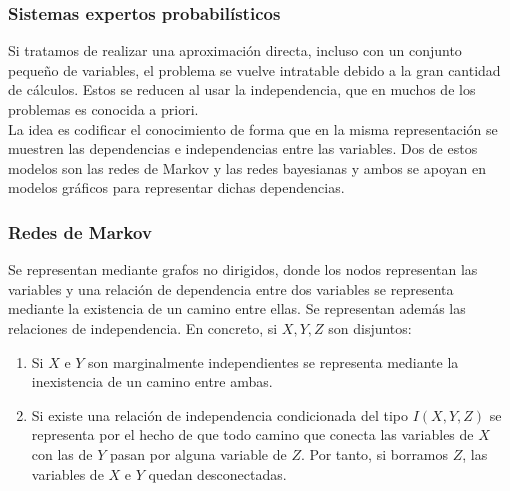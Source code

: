 \documentclass[leqno]{beamer}
\begin{document}
\begin{frame}
\frametitle{Sistemas expertos probabilísticos}
Si tratamos de realizar una aproximación directa, incluso con un conjunto pequeño de variables, el problema se vuelve intratable debido a la gran cantidad de cálculos. Estos se reducen al usar la independencia, que en muchos de los problemas es conocida a priori. \\
La idea es codificar el conocimiento de forma que en la misma representación se muestren las dependencias e independencias entre las variables. Dos de estos modelos son las redes de Markov y las redes bayesianas y ambos se apoyan en modelos gráficos para representar dichas dependencias.
\end{frame}

\begin{frame}
\frametitle{Redes de Markov}
Se representan mediante grafos no dirigidos, donde los nodos representan las variables y una relación de dependencia entre dos variables se representa mediante la existencia de un camino entre ellas. Se representan además las relaciones de independencia. En concreto, si $X,Y,Z$ son disjuntos:
\begin{enumerate}
\item Si $X$ e $Y$ son marginalmente independientes se representa mediante la inexistencia de un camino entre ambas.
\item Si existe una relación de independencia condicionada del tipo $I(X,Y,Z)$ se representa por el hecho de que todo camino que conecta las variables de $X$ con las de $Y$ pasan por alguna variable de $Z$. Por tanto, si borramos $Z$, las variables de $X$ e $Y$ quedan desconectadas.
\end{enumerate}
\end{frame}
\end{document}
